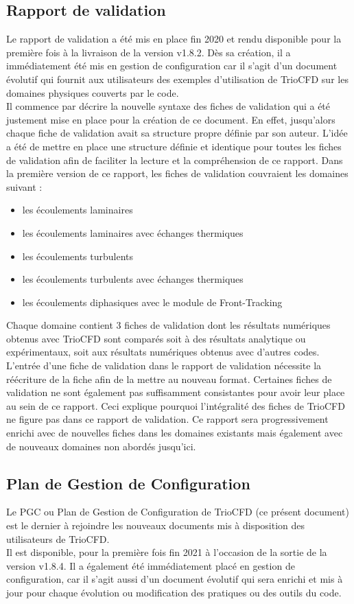 \subsection{\label{subsec:validation}Rapport de validation}
Le rapport de validation a été mis en place fin 2020 et rendu disponible pour la première fois à la livraison de la version v1.8.2. Dès sa création, il a immédiatement été mis en gestion de configuration car il s'agit d'un document évolutif qui fournit aux utilisateurs des exemples d'utilisation de TrioCFD sur les domaines physiques couverts par le code.\\
Il commence par décrire la nouvelle syntaxe des fiches de validation qui a été justement mise en place pour la création de ce document. En effet, jusqu'alors chaque fiche de validation avait sa structure propre définie par son auteur. L'idée a été de mettre en place une structure définie et identique pour toutes les fiches de validation afin de faciliter la lecture et la compréhension de ce rapport. Dans la première version de ce rapport, les fiches de validation couvraient les domaines suivant :\
\begin{itemize}
   \item les écoulements laminaires
   \item les écoulements laminaires avec échanges thermiques
   \item les écoulements turbulents
   \item les écoulements turbulents avec échanges thermiques
   \item les écoulements diphasiques avec le module de Front-Tracking
\end{itemize}

Chaque domaine contient 3 fiches de validation dont les résultats numériques obtenus avec TrioCFD
sont comparés soit \`a des r\'esultats analytique ou expérimentaux,
soit aux résultats numériques obtenus avec d'autres codes.\\

L'entrée d'une fiche de validation dans le rapport de validation nécessite la réécriture de la fiche afin de la mettre au nouveau format.
Certaines fiches de validation ne sont également pas suffisamment consistantes pour avoir leur place au sein de ce rapport.
Ceci explique pourquoi l'intégralité des fiches de TrioCFD ne figure pas dans ce rapport de validation.
Ce rapport sera progressivement enrichi avec de nouvelles fiches dans les domaines existants mais également avec de nouveaux domaines non abordés jusqu'ici.

\subsection{Plan de Gestion de Configuration}
Le PGC ou Plan de Gestion de Configuration de TrioCFD (ce présent document) est
le dernier à rejoindre les nouveaux documents mis à disposition des utilisateurs de TrioCFD.\\
Il est disponible, pour la première fois fin 2021 à l'occasion de la sortie de la version v1.8.4.
Il a également été immédiatement placé en gestion de configuration,
car il s'agit aussi d'un document évolutif qui sera enrichi
et mis à jour pour chaque évolution ou modification des pratiques ou des outils du code.

